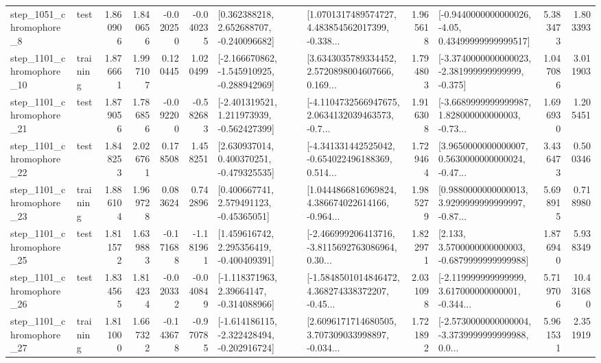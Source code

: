 \begin{tabular}{llrrrrllrlrr}
  step\_1051\_chromophore\_8 &      test &      1.860906 &    1.840656 &     -0.020250 & -0.040235 &    [0.362388218, 2.652688707, -0.240096682] &  [1.0701317489574727, 4.483854562017399, -0.338... &       1.965618 &  [-0.9440000000000026, -4.05, 0.43499999999999517] &            5.383473 &          1.803393 \\
 step\_1101\_chromophore\_10 &  training &      1.876661 &    1.997107 &      0.120445 &  1.020499 &  [-2.166670862, -1.545910925, -0.288942969] &  [3.6343035789334452, 2.5720898004607666, 0.169... &       1.794803 &  [-3.3740000000000023, -2.381999999999999, -0.375] &            1.047086 &          3.011903 \\
 step\_1101\_chromophore\_21 &      test &      1.879056 &    1.786856 &     -0.092200 & -0.582683 &   [-2.401319521, 1.211973939, -0.562427399] &  [-4.1104732566947675, 2.0634132039463573, -0.7... &       1.916308 &  [-3.6689999999999987, 1.828000000000003, -0.73... &            1.696930 &          1.205451 \\
 step\_1101\_chromophore\_22 &      test &      1.848253 &    2.026761 &      0.178508 &  1.458251 &    [2.630937014, 0.400370251, -0.479325535] &  [-4.341331442525042, -0.654022496188369, 0.514... &       1.729464 &  [3.9650000000000007, 0.5630000000000024, -0.47... &            3.436473 &          0.500346 \\
 step\_1101\_chromophore\_23 &  training &      1.886104 &    1.969728 &      0.083624 &  0.742896 &     [0.400667741, 2.579491123, -0.45365051] &  [1.0444866816969824, 4.386674022614166, -0.964... &       1.985279 &  [0.9880000000000013, 3.9299999999999997, -0.87... &            5.698915 &          0.718980 \\
 step\_1101\_chromophore\_25 &      test &      1.811572 &    1.639883 &     -0.171688 & -1.181961 &    [1.459616742, 2.295356419, -0.400409391] &  [-2.466999206413716, -3.8115692763086964, 0.30... &       1.822971 &   [2.133, 3.5700000000000003, -0.6879999999999988] &            1.876940 &          5.938349 \\
 step\_1101\_chromophore\_26 &      test &      1.834565 &    1.814234 &     -0.020332 & -0.040849 &    [-1.118371963, 2.39664147, -0.314088966] &  [-1.5848501014846472, 4.368274338372207, -0.45... &       2.031098 &  [-2.119999999999999, 3.617000000000001, -0.344... &            5.719706 &         10.431680 \\
 step\_1101\_chromophore\_27 &  training &      1.811000 &    1.667322 &     -0.143678 & -0.970785 &  [-1.614186115, -2.322428494, -0.202916724] &  [2.6096171714680505, 3.707309033998897, -0.034... &       1.721892 &  [-2.5730000000000004, -3.3739999999999988, 0.0... &            5.961531 &          2.351919 \\

\end{tabular}
